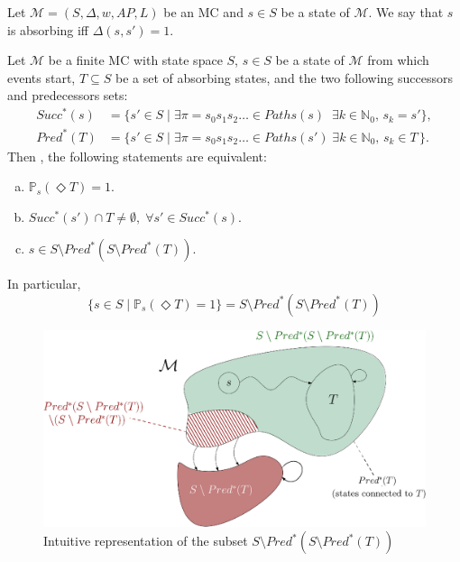 \begin{notation}
  Let $\mathcal{M}=(S, \Delta, w, AP, L)$ be an MC and $s \in S$ be a state of $\mathcal{M}$. We say that $s$ is absorbing iff $\Delta(s, s') = 1$.
\end{notation}

\begin{theorem}\label{asr}
  Let $\mathcal{M}$ be a finite MC with state space $S$, $s \in S$ be a state of $\mathcal{M}$ from which events start, $T \subseteq S$ be a set of absorbing states, and the two following successors and predecessors sets:
\begin{align*}
  Succ^*(s) &= \{ s' \in S \; | \; \exists \pi = s_0s_1s_2\dots \in Paths(s) \;\; \exists k \in \mathbb{N}_0, \, s_k = s' \}, \\
  Pred^*(T) &= \{ s' \in S \; | \; \exists \pi = s_0s_1s_2\dots \in Paths(s')\; \exists k \in \mathbb{N}_0, \, s_{k} \in T \,\}.
\end{align*}
   Then , the following statements are equivalent:
  \begin{enumerate}[(a)]
    \item $\mathbb{P}_s(\Diamond T)= 1$. \label{succ1}
    \item $Succ^*(s') \cap T \neq \emptyset, \; \forall s' \in Succ^*(s)$.\label{succ2}
    \item $s \in S \setminus Pred^*(S \setminus Pred^*(T))$. \label{succ3}
  \end{enumerate}
  In particular, \[
  \{s \in S \; | \; \mathbb{P}_s(\Diamond T) = 1\} =
  S \setminus Pred^*(S \setminus Pred^*(T))
  \]
  \begin{figure}[h]
  \centering
  \includegraphics[width=0.8\linewidth]{resources/S1BSCC}
  \caption{Intuitive representation of the subset $S \setminus Pred^*(S \setminus Pred^*(T))$}\label{spred}
  \end{figure}
\end{theorem}
